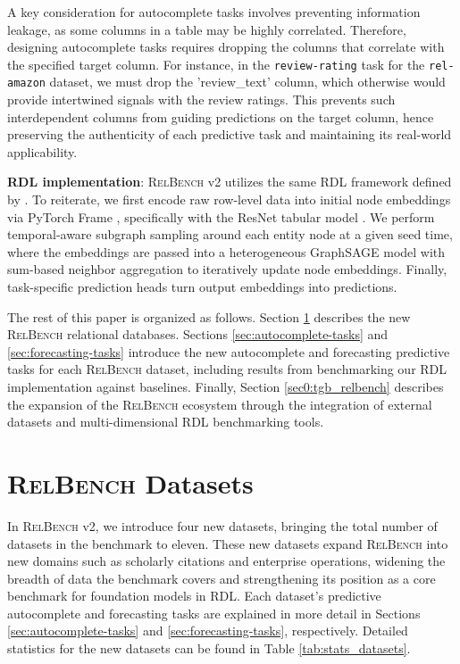 \documentclass{article} %
\newcommand{\amazon}{\texttt{rel-amazon}\xspace}
\newcommand{\relbench}{\textsc{RelBench}\xspace}
\begin{document}
A key consideration for autocomplete tasks involves preventing information leakage, as some columns in a table may be highly correlated. Therefore, designing autocomplete tasks requires dropping the columns that correlate with the specified target column. For instance, in the \texttt{review-rating} task for the \amazon dataset, we must drop the 'review\_text' column, which otherwise would provide intertwined signals with the review ratings. This prevents such interdependent columns from guiding predictions on the target column, hence preserving the authenticity of each predictive task and maintaining its real-world applicability.

\textbf{RDL implementation}: \relbench v2 utilizes the same RDL framework defined by \citet{relbench}. To reiterate, we first encode raw row-level data into initial node embeddings via PyTorch Frame \citep{hu2024pytorch}, specifically with the ResNet tabular model \citep{gorishniy2021revisiting}. We perform temporal-aware subgraph sampling \citep{rdl} around each entity node at a given seed time, where the embeddings are passed into a heterogeneous GraphSAGE model \citep{hamilton2017inductive, fey2019fast} with sum-based neighbor aggregation to iteratively update node embeddings. Finally, task-specific prediction heads turn output embeddings into predictions.

The rest of this paper is organized as follows. Section \ref{sec:datasets} describes the new \relbench relational databases. Sections \ref{sec:autocomplete-tasks} and \ref{sec:forecasting-tasks} introduce the new autocomplete and forecasting predictive tasks for each \relbench dataset, including results from benchmarking our RDL implementation against baselines. Finally, Section \ref{sec0:tgb_relbench} describes the expansion of the \relbench ecosystem through the integration of external datasets and multi-dimensional RDL benchmarking tools.

\section{\relbench Datasets} \label{sec:datasets}

In \relbench v2, we introduce four new datasets, bringing the total number of datasets in the benchmark to eleven. These new datasets expand \relbench into new domains such as scholarly citations and enterprise operations, widening the breadth of data the benchmark covers and strengthening its position as a core benchmark for foundation models in RDL. Each dataset's predictive autocomplete and forecasting tasks are explained in more detail in Sections \ref{sec:autocomplete-tasks} and \ref{sec:forecasting-tasks}, respectively. Detailed statistics for the new datasets can be found in Table \ref{tab:stats_datasets}.
\end{document}
